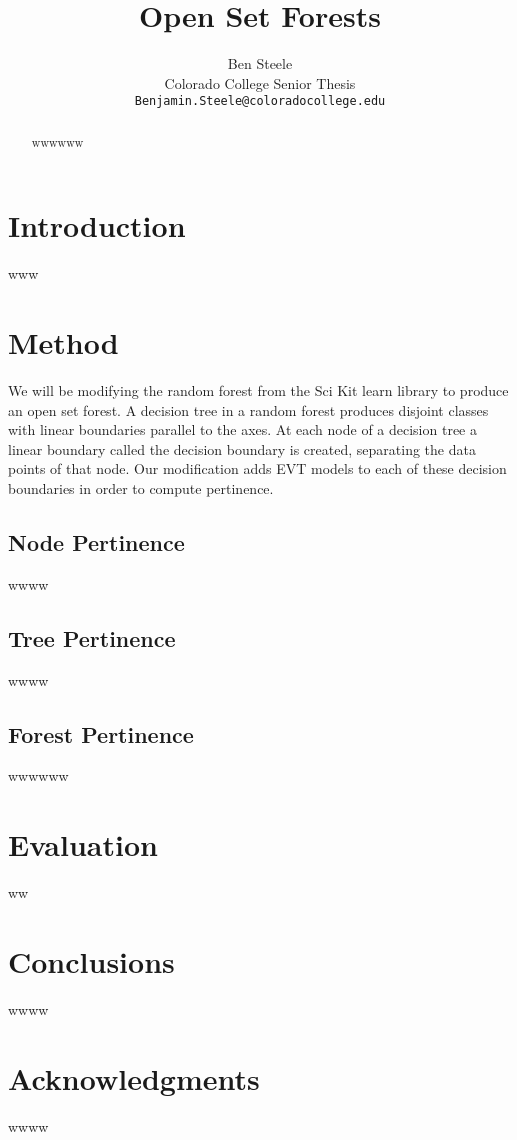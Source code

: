 \documentclass[conference]{IEEEtran}
\author{
Ben Steele \\
Colorado College Senior Thesis \\
\texttt{Benjamin.Steele@coloradocollege.edu} \\
}
\begin{document}
\title{Open Set Forests}

\author{
}

\maketitle

\begin{abstract}
wwwwww
\end{abstract}
\section{Introduction}

www
\section{Method}
	
We will be modifying the random forest from the Sci Kit learn library \cite{sklearn} to produce an open set forest.  A decision tree in a random forest produces disjoint classes with linear boundaries parallel to the axes.  At each node of a decision tree a linear boundary called the decision boundary is created, separating the data points of that node.  Our modification adds EVT models to each of these decision boundaries in order to compute pertinence.  
\subsection{Node Pertinence}
wwww
\subsection{Tree Pertinence}
wwww
\subsection{Forest Pertinence}

 wwwwww
\section{Evaluation}
ww

\section{Conclusions}

wwww
\section{Acknowledgments}
wwww


\end{document}
